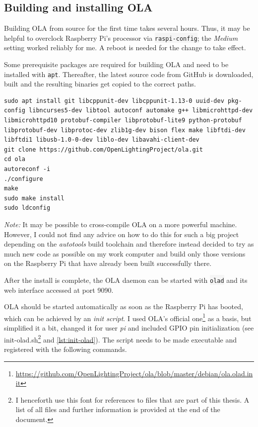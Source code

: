 \subsection{Building and installing
OLA}\label{building-and-installing-ola}

Building OLA from source for the first time takes several hours. Thus,
it may be helpful to overclock Raspberry Pi's processor via
\colorbox{WhiteSmoke}{\lstinline!raspi-config!}; the \emph{Medium} setting worked reliably for
me. A reboot is needed for the change to take effect.

Some prerequisite packages are required for building OLA and need to be
installed with \colorbox{WhiteSmoke}{\lstinline!apt!}. Thereafter, the latest source code from
GitHub is downloaded, built and the resulting binaries get copied to the
correct paths.

\begin{lstlisting}[style=myBash]
sudo apt install git libcppunit-dev libcppunit-1.13-0 uuid-dev pkg-config libncurses5-dev libtool autoconf automake g++ libmicrohttpd-dev libmicrohttpd10 protobuf-compiler libprotobuf-lite9 python-protobuf libprotobuf-dev libprotoc-dev zlib1g-dev bison flex make libftdi-dev libftdi1 libusb-1.0-0-dev liblo-dev libavahi-client-dev
git clone https://github.com/OpenLightingProject/ola.git
cd ola
autoreconf -i
./configure
make
sudo make install
sudo ldconfig
\end{lstlisting}

\emph{Note:} It may be possible to cross-compile OLA on a more powerful
machine. However, I could not find any advice on how to do this for such
a big project depending on the \emph{autotools} build toolchain and
therefore instead decided to try as much new code as possible on my work
computer and build only those versions on the Raspberry Pi that have
already been built successfully there.

After the install is complete, the OLA daemon can be started with
\colorbox{WhiteSmoke}{\lstinline!olad!} and its web interface accessed at port 9090.

OLA should be started automatically as
soon as the Raspberry Pi has booted, which can be achieved by an
\emph{init script}. I used OLA's official one\footnote{\url{https://github.com/OpenLightingProject/ola/blob/master/debian/ola.olad.init}}
as a basis, but simplified it a bit, changed it for user \emph{pi} and
included GPIO pin initialization (see \gls{init-olad.sh}\footnote{I
  henceforth use this font for references to files that are part of this
  thesis. A list of all files and further information is provided at the
  end of the document.} and \cref{lst:init-olad}). The script needs to
be made executable and registered with the following commands.


